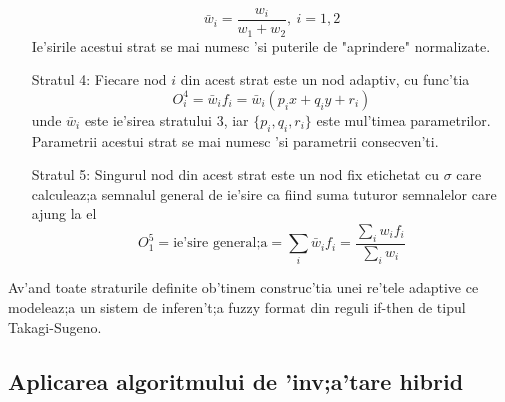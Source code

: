 \begin{enumerate}
\begin{equation}
\bar w_{i} = \frac {w_{i}} {w_{1} + w_{2}},\ i = 1, 2
\end{equation}
Ie'sirile acestui strat se mai numesc 'si puterile de "aprindere" normalizate.
\item [Stratul 4:] Fiecare nod $i$ din acest strat este un nod adaptiv, cu func'tia
\begin{equation}
O_{i}^{4} = \bar w_{i}f_{i} = \bar w_{i} (p_{i}x + q_{i}y + r_{i})
\end{equation}
unde $\bar w_{i}$ este ie'sirea stratului $3$, iar $\{p_{i}, q_{i}, r_{i}\}$ este mul'timea parametrilor. Parametrii acestui strat se mai numesc 'si parametrii consecven'ti.
\item [Stratul 5:] Singurul nod din acest strat este un nod fix etichetat cu $\sigma$ care calculeaz;a semnalul general de ie'sire ca fiind suma tuturor semnalelor care ajung la el
\begin{equation}
O_{1}^{5} = \text{ie'sire general;a} = \displaystyle \sum_{i} \bar w_{i}f_{i} = \frac {\sum_{i} w_{i}f_{i}} {\sum_{i} w_{i}}
\end{equation}
\end{enumerate}
\par

Av'and toate straturile definite ob'tinem construc'tia unei re'tele adaptive ce modeleaz;a un sistem de inferen't;a fuzzy format din reguli if-then de tipul Takagi-Sugeno. 

\subsection{Aplicarea algoritmului de 'inv;a'tare hibrid}

